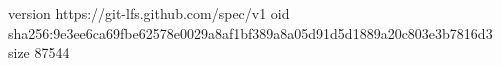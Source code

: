version https://git-lfs.github.com/spec/v1
oid sha256:9e3ee6ca69fbe62578e0029a8af1bf389a8a05d91d5d1889a20c803e3b7816d3
size 87544
